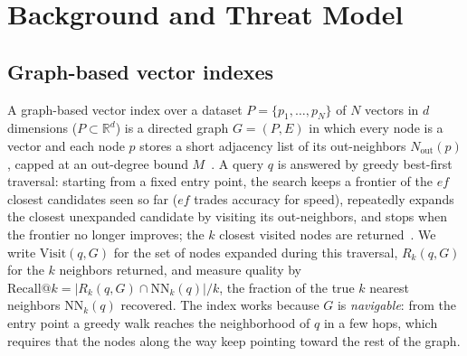\documentclass[sigconf, nonacm, review]{acmart}
\newcommand{\Nout}{N_{\mathrm{out}}}
\begin{document}
\section{Background and Threat Model}
\label{sec:background}

\subsection{Graph-based vector indexes}
A graph-based vector index over a dataset $P=\{p_1,\dots,p_N\}$ of $N$ vectors in $d$ dimensions
($P\subset\mathbb{R}^d$) is a directed graph $G=(P,E)$ in which every node is a
vector and each node $p$ stores a short adjacency list of its out-neighbors
$\Nout(p)$, capped at an out-degree bound $M$~\cite{DBLP:journals/pami/MalkovY20,DBLP:conf/nips/SubramanyaDSKK19}.
A query $q$ is answered by greedy best-first traversal: starting from a
fixed entry point, the search keeps a frontier of the $\mathit{ef}$ closest candidates
seen so far ($\mathit{ef}$ trades accuracy for speed), repeatedly expands the closest unexpanded
candidate by visiting its out-neighbors, and stops when the frontier no
longer improves; the $k$ closest visited nodes are
returned~\cite{DBLP:journals/pami/MalkovY20}. We write
$\mathrm{Visit}(q,G)$ for the set of nodes expanded during this traversal,
$R_k(q,G)$ for the $k$ neighbors returned, and measure quality by
$\mathrm{Recall}@k=|R_k(q,G)\cap\mathrm{NN}_k(q)|/k$, the fraction of the
true $k$ nearest neighbors $\mathrm{NN}_k(q)$ recovered. The index works
because $G$ is \emph{navigable}: from the entry point a greedy walk reaches
the neighborhood of $q$ in a few hops, which requires that the nodes along
the way keep pointing toward the rest of the graph.
\end{document}
